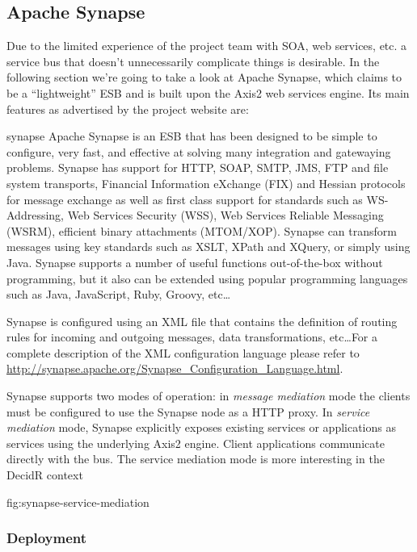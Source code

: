 \subsection{Apache Synapse}
\label{sec:apache-synapse}

Due to the limited experience of the project team with SOA, web services, etc.
a service bus that doesn't unnecessarily complicate things is desirable. In
the following section we're going to take a look at Apache Synapse, which
claims to be a ``lightweight'' ESB and is built upon the Axis2 web services
engine. Its main features as advertised by the project website are:

\begin{mycite}{synapse}
Apache Synapse is an ESB that has been designed to be simple to configure, very
fast, and effective at solving many integration and gatewaying problems. Synapse
has support for HTTP, SOAP, SMTP, JMS, FTP and file system transports, Financial
Information eXchange (FIX) and Hessian protocols for message exchange as well as
first class support for standards such as WS-Addressing, Web Services Security
(WSS), Web Services Reliable Messaging (WSRM), efficient binary attachments
(MTOM/XOP). Synapse can transform messages using key standards such as XSLT,
XPath and XQuery, or simply using Java. Synapse supports a number of useful
functions out-of-the-box without programming, but it also can be extended using
popular programming languages such as Java, JavaScript, Ruby, Groovy, etc\ldots
\end{mycite}

Synapse is configured using an XML file that contains the definition of routing
rules for incoming and outgoing messages, data transformations, etc\ldots For a
complete description of the XML configuration language please refer to 
\url{http://synapse.apache.org/Synapse_Configuration_Language.html}.

Synapse supports two modes of operation: in \emph{message mediation} mode
the clients must be configured to use the Synapse node as a HTTP proxy.
In \emph{service mediation} mode, Synapse explicitly exposes existing services
or applications as services using the underlying Axis2 engine. Client
applications communicate directly with the bus. The service mediation mode is
more interesting in the DecidR context 

{fig:synapse-service-mediation}

\newpage
\subsubsection{Deployment}
\label{subsec:deployment}

